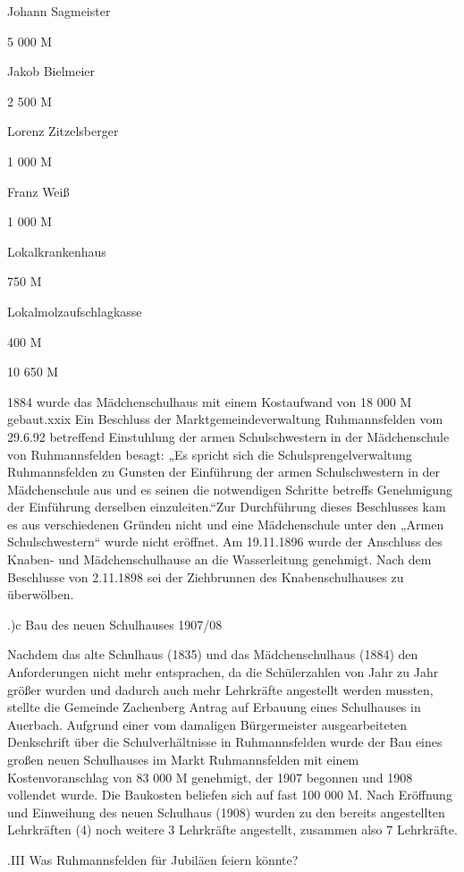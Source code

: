 \documentclass[12pt,a4paper]{book}
\begin{document}
Johann Sagmeister

5 000 M

Jakob Bielmeier

2 500 M

Lorenz Zitzelsberger

1 000 M

Franz Weiß

1 000 M

Lokalkrankenhaus

   750 M

Lokalmolzaufschlagkasse

   400 M



10 650 M

1884 wurde das Mädchenschulhaus mit einem Kostaufwand von 18 000 M gebaut.xxix
Ein Beschluss der Marktgemeindeverwaltung Ruhmannsfelden vom 29.6.92 betreffend
Einstuhlung der armen Schulschwestern in der Mädchenschule von Ruhmannsfelden
besagt: „Es spricht sich die Schulsprengelverwaltung Ruhmannsfelden zu Gunsten
der Einführung der armen Schulschwestern in der Mädchenschule aus und es seinen
die notwendigen Schritte betreffs Genehmigung der Einführung derselben
einzuleiten.“Zur Durchführung dieses Beschlusses kam es aus verschiedenen
Gründen nicht und eine Mädchenschule unter den „Armen Schulschwestern“ wurde
nicht eröffnet. Am 19.11.1896 wurde der Anschluss des Knaben- und
Mädchenschulhause an die Wasserleitung genehmigt. Nach dem Beschlusse von
2.11.1898 sei der Ziehbrunnen des Knabenschulhauses zu überwölben.

.)c Bau des neuen Schulhauses 1907/08

Nachdem das alte Schulhaus (1835) und das Mädchenschulhaus (1884) den
Anforderungen nicht mehr entsprachen, da die Schülerzahlen von Jahr zu Jahr
größer wurden und dadurch auch mehr Lehrkräfte angestellt werden mussten,
stellte die Gemeinde Zachenberg Antrag auf Erbauung eines Schulhauses in
Auerbach. Aufgrund einer vom damaligen Bürgermeister ausgearbeiteten Denkschrift
über die Schulverhältnisse in Ruhmannsfelden wurde der Bau eines großen neuen
Schulhauses im Markt Ruhmannsfelden mit einem Kostenvoranschlag von 83 000 M
genehmigt, der 1907 begonnen und 1908 vollendet wurde. Die Baukosten beliefen
sich auf fast 100 000 M. Nach Eröffnung und Einweihung des neuen Schulhaus
(1908) wurden zu den bereits angestellten Lehrkräften (4) noch weitere 3
Lehrkräfte angestellt, zusammen also 7 Lehrkräfte.

.III Was Ruhmannsfelden für Jubiläen feiern könnte?
\end{document}
